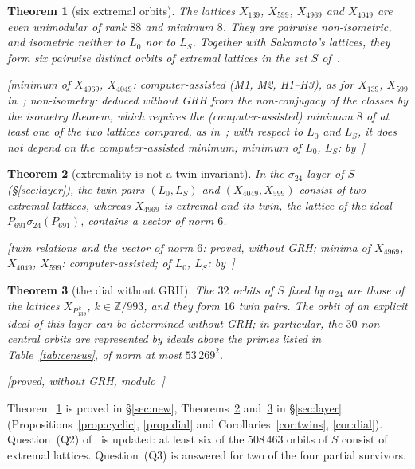 \documentclass[11pt,a4paper]{amsart}
\theoremstyle{plain}
\newtheorem{theorem}{Theorem}
\theoremstyle{definition}
\newcommand{\Z}{\mathbb{Z}}
\newcommand{\Lz}{L_{0}}
\newcommand{\LS}{L_{S}}
\newcommand{\st}[1]{\textup{\textsf{\small[#1]}}}
\begin{document}
\begin{theorem}[six extremal orbits]\label{thm:six}
The lattices $X_{139}$, $X_{599}$, $X_{4969}$ and $X_{4049}$ are even unimodular of rank $88$ and minimum $8$. They are pairwise non-isometric, and isometric neither to $\Lz$ nor to $\LS$. Together with Sakamoto's lattices, they form six pairwise distinct orbits of extremal lattices in the set $S$ of~\cite{Gau26}.

\st{minimum of $X_{4969}$, $X_{4049}$: computer-assisted (M1, M2, H1--H3), as for $X_{139}$, $X_{599}$ in~\cite[Thm.~6.11]{Gau26}; non-isometry: deduced without GRH from the non-conjugacy of the classes by the isometry theorem, which requires the (computer-assisted) minimum $8$ of at least one of the two lattices compared, as in~\cite[Thm.~6.11]{Gau26}; with respect to $\Lz$ and $\LS$, it does not depend on the computer-assisted minimum; minimum of $\Lz$, $\LS$: by~\cite{Sak26}}
\end{theorem}

\begin{theorem}[extremality is not a twin invariant]\label{thm:twins}
In the $\sigma_{24}$-layer of $S$ (\S\ref{sec:layer}), the twin pairs $(\Lz,\LS)$ and $(X_{4049},X_{599})$ consist of two extremal lattices, whereas $X_{4969}$ is extremal and its twin, the lattice of the ideal $P_{691}\sigma_{24}(P_{691})$, contains a vector of norm $6$.

\st{twin relations and the vector of norm $6$: proved, without GRH; minima of $X_{4969}$, $X_{4049}$, $X_{599}$: computer-assisted; of $\Lz$, $\LS$: by~\cite{Sak26}}
\end{theorem}

\begin{theorem}[the dial without GRH]\label{thm:dial}
The $32$ orbits of $S$ fixed by $\sigma_{24}$ are those of the lattices $X_{P_{139}^{\,k}}$, $k\in\Z/993$, and they form $16$ twin pairs. The orbit of an explicit ideal of this layer can be determined without GRH; in particular, the $30$ non-central orbits are represented by ideals above the primes listed in Table~\ref{tab:census}, of norm at most $53\,269^2$.

\st{proved, without GRH, modulo~\cite[Prop.~2.2, 2.5]{Gau26}}
\end{theorem}

Theorem~\ref{thm:six} is proved in \S\ref{sec:new}, Theorems~\ref{thm:twins} and~\ref{thm:dial} in \S\ref{sec:layer} (Propositions~\ref{prop:cyclic}, \ref{prop:dial} and Corollaries~\ref{cor:twins}, \ref{cor:dial}). Question~(Q2) of~\cite{Gau26} is updated: at least six of the $508\,463$ orbits of $S$ consist of extremal lattices. Question~(Q3) is answered for two of the four partial survivors.
\end{document}
